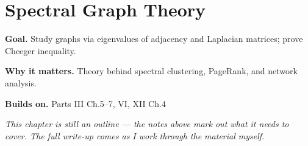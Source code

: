 \chapter{Spectral Graph Theory}
\label{ch:12-functional-analysis-and-spectral-theory-08}

\begin{chapterintro}
\textbf{Goal.} Study graphs via eigenvalues of adjacency and Laplacian matrices; prove Cheeger inequality.

\textbf{Why it matters.} Theory behind spectral clustering, PageRank, and network analysis.

\textbf{Builds on.} Parts III Ch.5–7, VI, XII Ch.4
\end{chapterintro}

\textit{This chapter is still an outline --- the notes above mark out what it needs to cover. The full write-up comes as I work through the material myself.}
